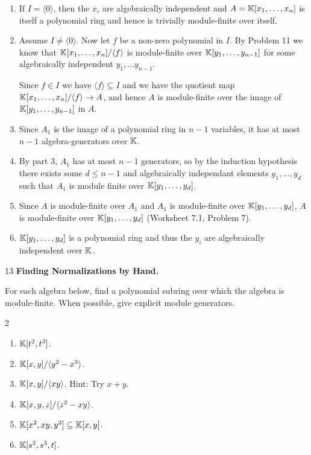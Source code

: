 \documentclass[Notebook.tex]{subfiles}
\begin{document}
\begin{solution}
    \bbni
    \begin{enumerate}
        \item If $I = \langle 0 \rangle$, then the $x_i$ are algebraically independent and $A = \mathbb K[x_1, \ldots, x_n]$ is itself a polynomial ring and hence is trivially module-finite over itself. 
        \item Assume $I \neq \langle 0 \rangle$. Now let $f$ be a non-zero polynomial in $I$. By Problem 11 we know that $\mathbb K[x_1, \ldots, x_n]/\langle f \rangle$ is module-finite over $\mathbb K[y_1, \ldots, y_{n-1}]$ for some algebraically independent $y_1, \ldots y_{n-1}$. 
        
        Since $f \in I$ we have $\langle f \rangle \subseteq I$ and we have the quotient map $\mathbb K[x_1, \ldots, x_n] /\langle f \rangle \to A$, and hence $A$ is module-finite over the image of $\mathbb K[y_1, \ldots, y_{n-1}]$ in $A$. 

        \item Since $A_1$ is the image of a polynomial ring in $n-1$ variables, it has at most $n-1$ algebra-generators over $\mathbb K$.  
        
        \item By part 3, $A_1$ has at most $n-1$ generators, so by the induction hypothesis there exists some $d \leq n-1$ and algebraically independant elements $y_1, \ldots, y_d$ such that $A_1$ is module finite over $\mathbb K[y_1, \ldots, y_d]$. 
        
        \item Since $A$ is module-finite over $A_1$ and $A_1$ is module-finite over $\mathbb K[y_1, \ldots, y_d]$, $A$ is module-finite over $\mathbb K[y_1, \ldots, y_d]$ (Worksheet 7.1, Problem 7). 
        
        \item $\mathbb K[y_1, \ldots, y_d]$ is a polynomial ring and thus the $y_i$ are algebraically independent over $\mathbb K$. 
    \end{enumerate}
\end{solution}


\newpage 

\begin{problem}{13} \textbf{Finding Normalizations by Hand.} 

    For each algebra below, find a polynomial subring over which the algebra is module-finite. When possible, give explicit module generators.
    \begin{multicols}{2}
    \begin{enumerate}
        \item $\mathbb K[t^2,t^3]$.
        \item $\mathbb K[x,y]/\langle y^2-x^3\rangle$.
        \item $\mathbb K[x,y]/\langle xy\rangle$. Hint: Try $x+y$.
        \item $\mathbb K[x,y,z]/\langle z^2-xy\rangle$.
        \item $\mathbb K[x^2,xy,y^2]\subseteq \mathbb K[x,y]$.
        \item $\mathbb K[s^2,s^3,t]$.
    \end{enumerate}
    \end{multicols}
\end{problem}
\end{document}
